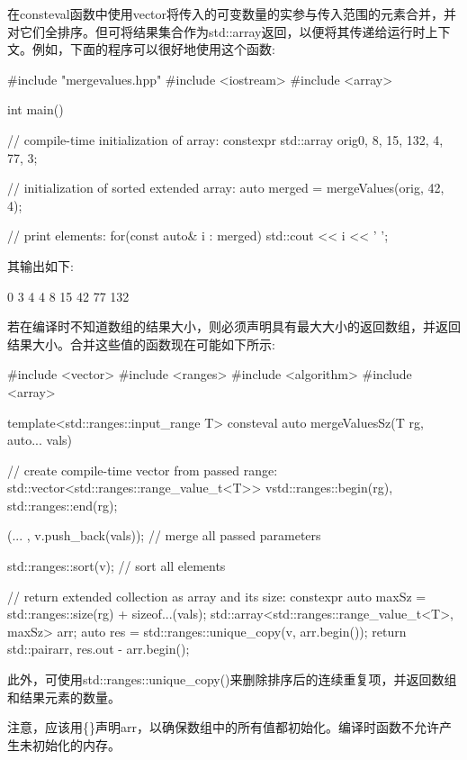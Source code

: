 在consteval函数中使用vector将传入的可变数量的实参与传入范围的元素合并，并对它们全排序。但可将结果集合作为std::array返回，以便将其传递给运行时上下文。例如，下面的程序可以很好地使用这个函数:


\begin{cpp}
#include "mergevalues.hpp"
#include <iostream>
#include <array>

int main()
{
	// compile-time initialization of array:
	constexpr std::array orig{0, 8, 15, 132, 4, 77, 3};
	
	// initialization of sorted extended array:
	auto merged = mergeValues(orig, 42, 4);
	
	// print elements:
	for(const auto& i : merged) {
		std::cout << i << ' ';
	}
}
\end{cpp}

其输出如下:

\begin{shell}
0 3 4 4 8 15 42 77 132
\end{shell}

若在编译时不知道数组的结果大小，则必须声明具有最大大小的返回数组，并返回结果大小。合并这些值的函数现在可能如下所示:


\begin{cpp}
#include <vector>
#include <ranges>
#include <algorithm>
#include <array>

template<std::ranges::input_range T>
consteval auto mergeValuesSz(T rg, auto... vals)
{
	// create compile-time vector from passed range:
	std::vector<std::ranges::range_value_t<T>> v{std::ranges::begin(rg),
												 std::ranges::end(rg)};
												 
	(... , v.push_back(vals)); // merge all passed parameters
	
	std::ranges::sort(v); // sort all elements
	
	// return extended collection as array and its size:
	constexpr auto maxSz = std::ranges::size(rg) + sizeof...(vals);
	std::array<std::ranges::range_value_t<T>, maxSz> arr{};
	auto res = std::ranges::unique_copy(v, arr.begin());
	return std::pair{arr, res.out - arr.begin()};
}
\end{cpp}

此外，可使用std::ranges::unique\_copy()来删除排序后的连续重复项，并返回数组和结果元素的数量。

注意，应该用\{\}声明arr，以确保数组中的所有值都初始化。编译时函数不允许产生未初始化的内存。

